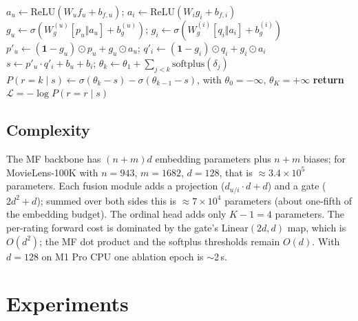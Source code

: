 \documentclass[a4paper]{article} %
\begin{document}
\begin{algorithm}[ht]
\caption{Forward pass and ordinal NLL for one observed rating $(u,i,r)$.}
\label{alg:forward}
\begin{algorithmic}[1]
\STATE $a_u\leftarrow\mathrm{ReLU}(W_u f_u + b_{f,u})$;\quad
       $a_i\leftarrow\mathrm{ReLU}(W_i g_i + b_{f,i})$ \hfill{}
\STATE $g_u\leftarrow\sigma(W_g^{(u)}[p_u\Vert a_u]+b_g^{(u)})$;\quad
       $g_i\leftarrow\sigma(W_g^{(i)}[q_i\Vert a_i]+b_g^{(i)})$ \hfill{}
\STATE $p'_u\leftarrow(\mathbf{1}-g_u)\odot p_u + g_u\odot a_u$;\quad
       $q'_i\leftarrow(\mathbf{1}-g_i)\odot q_i + g_i\odot a_i$
\STATE $s\leftarrow p'_u\cdot q'_i + b_u + b_i$;\quad
       $\theta_k\leftarrow\theta_1+\sum_{j<k}\mathrm{softplus}(\delta_j)$
\STATE $P(r{=}k\mid s)\leftarrow\sigma(\theta_k-s)-\sigma(\theta_{k-1}-s)$,\;
       with $\theta_0{=}-\infty,\,\theta_K{=}+\infty$
\STATE \textbf{return} $\mathcal{L}=-\log P(r{=}r\mid s)$
\end{algorithmic}
\end{algorithm}

\subsection{Complexity}
\label{sec:complexity}
The MF backbone has $(n+m)d$ embedding parameters plus $n+m$ biases; for
MovieLens-100K with $n=943$, $m=1682$, $d=128$, that is $\approx 3.4\times10^5$
parameters. Each fusion module adds a projection ($d_{u/i}\cdot d + d$) and a gate
($2d^2+d$); summed over both sides this is $\approx 7\times10^4$ parameters
(about one-fifth of the embedding budget). The ordinal head adds only
$K-1=4$ parameters. The per-rating forward cost is dominated by the gate's
$\mathrm{Linear}(2d, d)$ map, which is $O(d^2)$; the MF dot product and the
softplus thresholds remain $O(d)$. With $d{=}128$ on M1 Pro CPU one ablation
epoch is $\sim$2\,s.

\section{Experiments}
\label{sec:exp}
\end{document}
